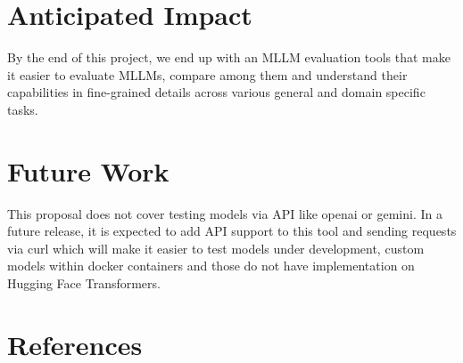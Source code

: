 \documentclass[
	letterpaper, %
]{jdf}
\begin{document}
\section{Anticipated Impact}\label{sect:impact}
By the end of this project, we end up with an MLLM evaluation tools that make it easier to evaluate MLLMs, compare among them and understand their capabilities in fine-grained details across various general and domain specific tasks.

\section{Future Work}
This proposal does not cover testing models via API like openai or gemini.
In a future release, it is expected to add API support to this tool and sending requests via curl which will make it easier to test models under development, custom models within docker containers and those do not have implementation on Hugging Face Transformers.

\section{References}
\printbibliography[heading=none]
\end{document}
